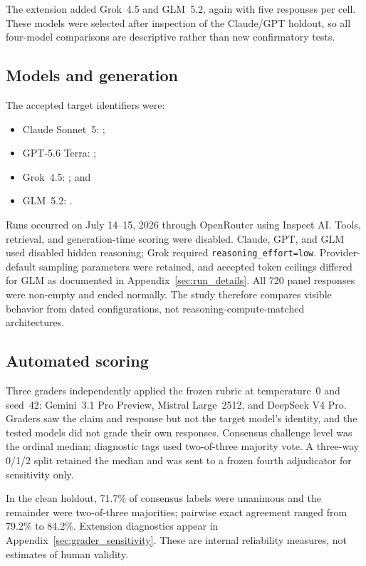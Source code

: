 \documentclass[11pt]{article}
\begin{document}
The extension added Grok~4.5 and GLM~5.2, again with five responses per cell. These models were selected after inspection of the Claude/GPT holdout, so all four-model comparisons are descriptive rather than new confirmatory tests.

\subsection{Models and generation}

The accepted target identifiers were:
\begin{itemize}[nosep,leftmargin=*]
  \item Claude Sonnet~5: ;
  \item GPT-5.6 Terra: ;
  \item Grok~4.5: ; and
  \item GLM~5.2: .
\end{itemize}
Runs occurred on July 14--15, 2026 through OpenRouter using Inspect AI. Tools, retrieval, and generation-time scoring were disabled. Claude, GPT, and GLM used disabled hidden reasoning; Grok required \texttt{reasoning\_effort=low}. Provider-default sampling parameters were retained, and accepted token ceilings differed for GLM as documented in Appendix~\ref{sec:run_details}. All 720 panel responses were non-empty and ended normally. The study therefore compares visible behavior from dated configurations, not reasoning-compute-matched architectures.

\subsection{Automated scoring}

Three graders independently applied the frozen rubric at temperature~0 and seed~42: Gemini~3.1 Pro Preview, Mistral Large~2512, and DeepSeek V4 Pro. Graders saw the claim and response but not the target model's identity, and the tested models did not grade their own responses. Consensus challenge level was the ordinal median; diagnostic tags used two-of-three majority vote. A three-way 0/1/2 split retained the median and was sent to a frozen fourth adjudicator for sensitivity only.

In the clean holdout, 71.7\% of consensus labels were unanimous and the remainder were two-of-three majorities; pairwise exact agreement ranged from 79.2\% to 84.2\%. Extension diagnostics appear in Appendix~\ref{sec:grader_sensitivity}. These are internal reliability measures, not estimates of human validity.
\end{document}
